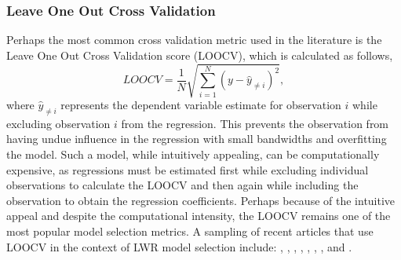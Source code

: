 \documentclass{article}\usepackage[]{graphicx}\usepackage[]{color}
\begin{document}
\subsubsection{Leave One Out Cross Validation}
Perhaps the most common cross validation metric used in the literature is the Leave One Out Cross Validation score (LOOCV), which is calculated as follows,
\begin{equation}\label{eq:LOOCV}
LOOCV = \frac{1}{N} \sqrt{\sum _{i = 1}^{N} (y - \hat{y}_{\neq i})^2},  
\end{equation}
where $\hat{y}_{\neq i}$ represents the dependent variable estimate for observation $i$ while excluding observation $i$ from the regression. This prevents the observation from having undue influence in the regression with small bandwidths and overfitting the model. Such a model, while intuitively appealing, can be computationally expensive, as regressions must be estimated first while excluding individual observations to calculate the LOOCV and then again while including the observation to obtain the regression coefficients. Perhaps because of the intuitive appeal and despite the computational intensity, the LOOCV remains one of the most popular model selection metrics. A sampling of recent articles that use LOOCV in the context of LWR model selection include:
\citet{Brunsdon1998}, \citet{Huang2002}, \citet{Lloyd2005}, \citet{Cho2006a}, \citet{Yu2006}, \citet{Cho2009}, \citet{Cho2009a}, and \citet{Huang2010}.
\end{document}
